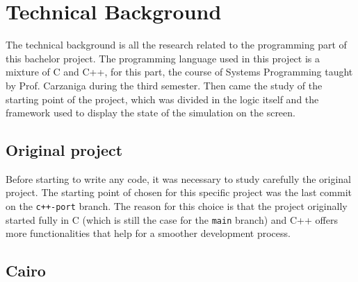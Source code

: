 \section{Technical Background}

The technical background is all the research related to the programming part of
this bachelor project. The programming language used in this project is a
mixture of C and C++, for this part, the course of Systems Programming taught by
Prof. Carzaniga during the third semester. Then came the study of the starting
point of the project, which was divided in the logic itself and the framework
used to display the state of the simulation on the screen.

\subsection{Original project}

Before starting to write any code, it was necessary to study carefully the
original project. The starting point of chosen for this specific project was the
last commit on the \texttt{c++-port} branch. The reason for this choice is that
the project originally started fully in C (which is still the case for the
\texttt{main} branch) and C++ offers more functionalities that help for a
smoother development process.


\subsection{Cairo}
